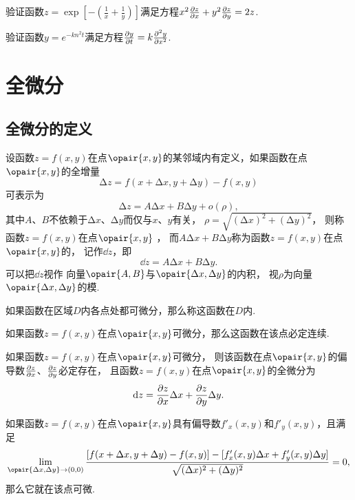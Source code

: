\begin{example}
验证函数\(z = \exp[-\left(\frac{1}{x}+\frac{1}{y}\right)]\)满足方程\(x^2 \pdv{z}{x} + y^2 \pdv{z}{y} = 2z\).
\end{example}

\begin{example}
验证函数\(y = e^{-k n^2 t}\)满足方程\(\pdv{y}{t} = k \pdv[2]{y}{x}\).
\end{example}

\section{全微分}
\subsection{全微分的定义}
\begin{definition}
设函数\(z=f(x,y)\)在点\(\opair{x,y}\)的某邻域内有定义，如果函数在点\(\opair{x,y}\)的全增量\[
\increment z = f(x+\increment x,y+\increment y)-f(x,y)
\]可表示为\[
\increment z = A \increment x + B \increment y + o(\rho),
\]其中\(A\)、\(B\)不依赖于\(\increment x\)、\(\increment y\)而仅与\(x\)、\(y\)有关，
\(\rho=\sqrt{(\increment x)^2+(\increment y)^2}\)，
则称函数\(z=f(x,y)\)在点\(\opair{x,y}\) ，
而\(A \increment x + B \increment y\)称为函数\(z=f(x,y)\)在点\(\opair{x,y}\)的，
记作\(\dd{z}\)，即\[
\dd{z} = A \increment x + B \increment y.
\]可以把\(\dd{z}\)视作%
向量\(\opair{A,B}\)与\(\opair{\increment x,\increment y}\)的内积，
视\(\rho\)为向量\(\opair{\increment x,\increment y}\)的模.

如果函数在区域\(D\)内各点处都可微分，那么称这函数在\(D\)内.
\end{definition}

\begin{theorem}
如果函数\(z=f(x,y)\)在点\(\opair{x,y}\)可微分，那么这函数在该点必定连续.
\end{theorem}

\begin{theorem}[必要条件]\label{theorem:多元函数微分法.二元函数可微的必要条件}
如果函数\(z=f(x,y)\)在点\(\opair{x,y}\)可微分，
则该函数在点\(\opair{x,y}\)的偏导数\(\pdv{z}{x}\)、\(\pdv{z}{y}\)必定存在，
且函数\(z=f(x,y)\)在点\(\opair{x,y}\)的全微分为\[
\dd{z} = \pdv{z}{x} \Delta x + \pdv{z}{y} \Delta y.
\]
\end{theorem}

\begin{corollary}
如果函数\(z=f(x,y)\)在点\(\opair{x,y}\)具有偏导数\(f'_x(x,y)\)和\(f'_y(x,y)\)，且满足\[
\lim\limits_{\opair{\increment x,\increment y}\to(0,0)}
 \frac{[f(x+\increment x,y+\increment y)-f(x,y)]-[f'_x(x,y) \increment x + f'_y(x,y) \increment y]}{\sqrt{(\increment x)^2+(\increment y)^2}} = 0,
\]那么它就在该点可微.
\end{corollary}

